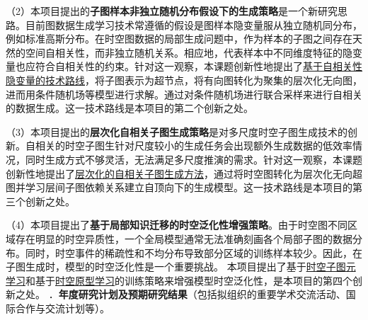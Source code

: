 \documentclass[12pt,UTF8,AutoFakeBold=2,a4paper]{ctexart} %
\newcommand{\sihao}{\fontsize{14pt}{\baselineskip}\selectfont}
\begin{document}
（2）本项目提出的\textbf{子图样本非独立随机分布假设下的生成策略}是一个新研究思路。目前图数据生成学习技术常遵循的假设是图样本隐变量服从独立随机同分布，例如标准高斯分布。在时空图数据的局部生成问题中，作为样本的子图之间存在天然的空间自相关性，而非独立随机关系。相应地，代表样本中不同维度特征的隐变量也应符合自相关性的约束。针对这一观察，本课题创新性地提出了\underline{基于自相关性隐变量的技术路线}，将子图表示为超节点，将有向图转化为聚集的层次化无向图，进而用条件随机场等模型进行求解。通过对条件随机场进行联合采样来进行自相关的数据生成。这一技术路线是本项目的第二个创新之处。

（3）本项目提出的\textbf{层次化自相关子图生成策略}是对多尺度时空子图生成技术的创新。自相关的时空子图生针对尺度较小的生成任务会出现额外生成数据的低效率情况，同时生成方式不够灵活，无法满足多尺度推演的需求。针对这一观察，本课题创新性地提出了\underline{层次化的自相关子图生成方法}，通过将时空图转化为层次化无向超图并学习层间子图依赖关系建立自顶向下的生成模型。这一技术路线是本项目的第三个创新之处。

（4）本项目提出了\textbf{基于局部知识迁移的时空泛化性增强策略}。由于时空图不同区域存在明显的时空异质性，一个全局模型通常无法准确刻画各个局部子图的数据分布。同时，时空事件的稀疏性和不均分布导致部分区域的训练样本较少。因此，在子图生成时，模型的时空泛化性是一个重要挑战。%
本项目提出了基于\underline{时空子图元学习}和基于\underline{时空原型学习}的训练策略来增强模型时空泛化性，是本项目的第四个创新之处。
\newpage
{\sihao \color{MsBlue} ．{\bfseries 年度研究计划及预期研究结果}（包括拟组织的重要学术交流活动、国际合作与交流计划等）。}
\end{document}
